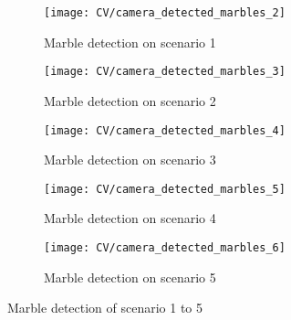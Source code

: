 \documentclass[../Head/Main.tex]{subfiles}
\begin{document}
\begin{figure}[H]
	\centering
	\begin{subfigure}[b]{0.196\textwidth}
		\centering
		\texttt{[image: CV/camera\_detected\_marbles\_2]}
		\caption{Marble detection on scenario 1}
	\end{subfigure}
	\hfill
	\begin{subfigure}[b]{0.196\textwidth}
		\centering
		\texttt{[image: CV/camera\_detected\_marbles\_3]}
		\caption{Marble detection on scenario 2}
	\end{subfigure}
	\hfill
	\begin{subfigure}[b]{0.196\textwidth}
		\centering
		\texttt{[image: CV/camera\_detected\_marbles\_4]}
		\caption{Marble detection on scenario 3}
	\end{subfigure}
	\hfill
	\begin{subfigure}[b]{0.196\textwidth}
		\centering
		\texttt{[image: CV/camera\_detected\_marbles\_5]}
		\caption{Marble detection on scenario 4}
	\end{subfigure}
	\hfill
	\begin{subfigure}[b]{0.196\textwidth}
		\centering
		\texttt{[image: CV/camera\_detected\_marbles\_6]}
		\caption{Marble detection on scenario 5}
	\end{subfigure}
	\caption{Marble detection of scenario 1 to 5}
	\label{fig:md_1_5}
\end{figure} 
\end{document}
